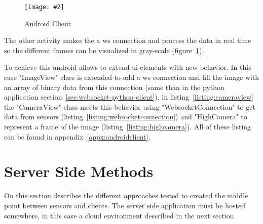 \documentclass[hidelinks,11pt,a4paper,oneside,article]{memoir}
\newcommand{\putimage}[3][10] %
{
\begin{figure}[h]
	\centering
	\captionsetup{justification=centering}
	\texttt{[image: \#2]}
	\caption{#3}
	\label{fig:#2}
\end{figure}
}
\begin{document}
    \putimage[16]{android-client3}{Android Client}

The other activity makes the a \gls{ws} connection and process the data in real time so the different frames can be visualized in gray-scale (figure~\ref{fig:android-client3}).

To achieve this \gls{android} allows to extend \gls{ui} elements with new behavior. In this case "ImageView" class is extended to add a \gls{ws} connection and fill the image with an array of binary data from this connection (same than in the python application section~\ref{sec:websocket-python-client}), in listing~\ref{listing:cameraview} the "CameraView" class meets this behavior using "WebsocketConnection" to get data from sensors (listing~\ref{listing:websocketconnection}) and "HighCamera" to represent a frame of the image (listing~\ref{listing:highcamera}). All of these listing can be found in appendix~\ref{appx:androidclient}.


\section{Server Side Methods}\label{sec:server-side-methods} 
On this section describes the different approaches tested to created the middle point between sensors and clients. The server side application must be hosted somewhere, in this case a cloud environment described in the next section.
\end{document}
